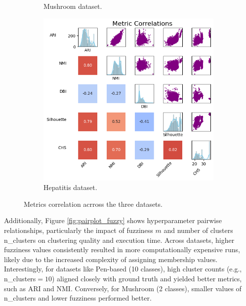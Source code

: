 \begin{figure}[H]
\begin{subfigure}{0.32\textwidth}
		\caption{Mushroom dataset.}
	\end{subfigure}
	\begin{subfigure}{0.32\textwidth}
		\centering
		\includegraphics[width=\linewidth]{figures/FuzzyCMeans/hepatitis_metrics_correlations_matrix.png}
		\caption{Hepatitis dataset.}
	\end{subfigure}
	\caption{Metrics correlation acrross the three datasets.}
	\label{fig:metrics_corr_fuzzy}
\end{figure}


Additionally, Figure \ref{fig:pairplot_fuzzy} shows hyperparameter pairwise relationships, particularly the impact of fuzziness $m$ and number of clusters n\_clusters on clustering quality and execution time. Across datasets, higher fuzziness values consistently resulted in more computationally expensive runs, likely due to the increased complexity of assigning membership values. Interestingly, for datasets like Pen-based (10 classes), high cluster counts (e.g., n\_clusters$=10$) aligned closely with ground truth and yielded better metrics, such as ARI and NMI. Conversely, for Mushroom (2 classes), smaller values of n\_clusters and lower fuzziness performed better.


